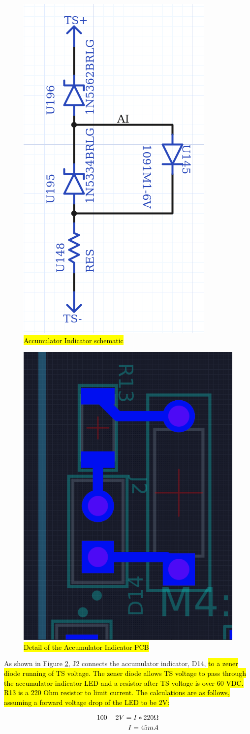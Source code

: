\documentclass{article}
\DeclareRobustCommand{\hlr}[1]{{\sethlcolor{red}\hl{#1}}}
\begin{document}
            \begin{figure}[H]
                \centering
                \includegraphics[width = 0.3 \textwidth]{aischem}
                \caption{\hlr{Accumulator Indicator schematic}}
                \label{aischem}
            \end{figure}

            \begin{figure}[H]
                \centering
                \includegraphics[width = 0.3 \textwidth]{ai}
                \caption{\hlr{Detail of the Accumulator Indicator PCB}}
                \label{indicator}
            \end{figure}

            As shown in Figure \ref{indicator}, J2 connects the accumulator indicator, D14, \hlr{to a zener diode running of TS voltage. The zener diode allows TS voltage to pass through the accumulator indicator LED and a resistor after TS voltage is over 60 VDC.  R13 is a 220 Ohm resistor to limit current. The calculations are as follows, assuming a forward voltage drop of the LED to be 2V:}

            \begin{align}
                100-2 V = I * 220 \ohm \\
                I = 45 mA
            \end{align}
\end{document}
